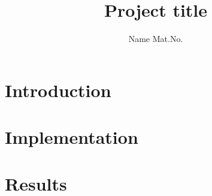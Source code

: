\documentclass[a4paper,11pt,singlespacing]{article}
\title{Project title}
\author{
	Name Mat.No.
	}
\begin{document}
\setlength{\parindent}{0ex}


\maketitle

\pagebreak

\tableofcontents
\pagebreak



\section{Introduction}


\section{Implementation}


\section{Results}


\printbibliography[heading=bibintoc]
\end{document}
